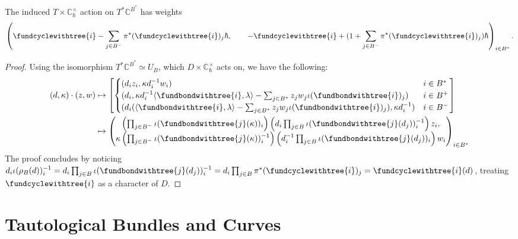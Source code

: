 \documentclass[b5paper]{article}
\newcommand{\Chbar}{\mathbb{C}^\times _\hbar}
\begin{document}
\begin{proposition}[pps:]{}
  The induced $T\times \Chbar$ action on $T^*\mathbb{C}^{B^*}$ has weights 
  \[
    \left(
      \fundcyclewithtree{i}-\sum_{j\in B^-}^{}\pi^*(\fundcyclewithtree{i})_j\hbar,\qquad 
    -\fundcyclewithtree{i}+(1+\sum_{j\in B^-}^{}\pi^*(\fundcyclewithtree{i})_j)\hbar
  \right)_{i\in B^*}.
  \]
  \begin{proof}
      Using the isomorphism $T^*\mathbb{C}^{B^*}\simeq U_B$, which $D\times \Chbar$ acts on, we have the following:
      \begin{alignat*}{1}
          (d,\kappa)\cdot (z,w)
          &\mapsto 
          \left[
              \begin{cases}
                  (d_iz_i,\kappa d_i^{-1}w_i)&i\in B^*\\
                  (d_i, \kappa d_i^{-1}\AB{\fundbondwithtree{i},\lambda}-\sum_{j\in B^*}^{}z_jw_j\iota(\fundbondwithtree{i})_j) &i\in B^+\\
                  (d_i(\AB{\fundbondwithtree{i},\lambda}-\sum_{j\in B^*}^{}z_jw_j\iota(\fundbondwithtree{i})_j),\kappa d_i^{-1}) &i\in B^-\\
              \end{cases}
          \right]\\
          &\mapsto
          \begin{pmatrix}
              \left(\prod_{j\in B^-}^{}\iota(\fundbondwithtree{j}(\kappa))_i\right)\left(d_i\prod_{j\in B}^{}\iota(\fundbondwithtree{j}(d_j))^{-1}_i\right)z_i, \\
              \kappa\left(\prod_{j\in B^-}^{}\iota(\fundbondwithtree{j}(\kappa))_i^{-1}\right)\left(d_i^{-1}\prod_{j\in B}^{}\iota(\fundbondwithtree{j}(d_j))_i\right)w_i 
          \end{pmatrix}
          _{i\in B^*}
      \end{alignat*}
      The proof concludes by noticing $d_i\iota(\rho_B(d))^{-1}_i=d_i\prod_{j\in B}^{}\iota(\fundbondwithtree{j}(d_j))^{-1}_i=d_i\prod_{j\in B}^{}\pi^*(\fundcyclewithtree{i})_j=\fundcyclewithtree{i}(d)$, treating $\fundcyclewithtree{i}$ as a character of $D$.
  \end{proof}
\end{proposition}

\section{Tautological Bundles and Curves}
\end{document}
